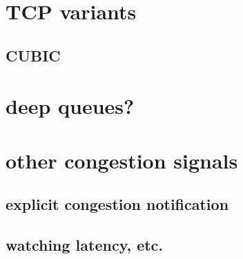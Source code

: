\section{TCP variants}


\subsection{CUBIC}



\section{deep queues?}


\section{other congestion signals}



\subsection{explicit congestion notification}


\subsection{watching latency, etc.}


